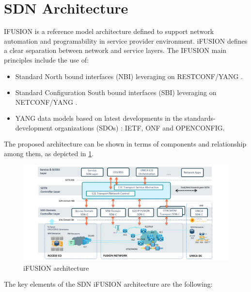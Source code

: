 \documentclass[a4paper,fleqn]{cas-dc}
\begin{document}
\section{SDN Architecture}
\label{section:arq}

\uppercase{iFUSION} is a reference model architecture defined to support network automation and programability in service provider environment. iFUSION defines a clear separation between network and service layers.  The \uppercase{iFUSION} main principles include the use of:
\begin{itemize}
    \item Standard North bound interfaces (NBI) leveraging on \uppercase{RESTconf/YANG} \cite{bierman2017restconf}.
    \item Standard Configuration South bound interfaces (SBI) leveraging on \uppercase{NETCONF/YANG} \cite{enns2011network}.
    \item YANG data models based on latest developments in the standards-development organizations (SDOs) \cite{bjorklund2016yang}: \uppercase{IETF}, \uppercase{ONF} and \uppercase{OpenConfig}.
\end{itemize}

The proposed architecture can be shown in terms of components and relationship among them, as depicted in \ref{FIG:1}. 

\begin{figure}
	\centering
		\includegraphics[width=\linewidth]{figs/ifusion_architecture.png}
	\caption{iFUSION architecture}
	\label{FIG:1}
\end{figure}

The key elements of the SDN iFUSION architecture are the following:
\end{document}
